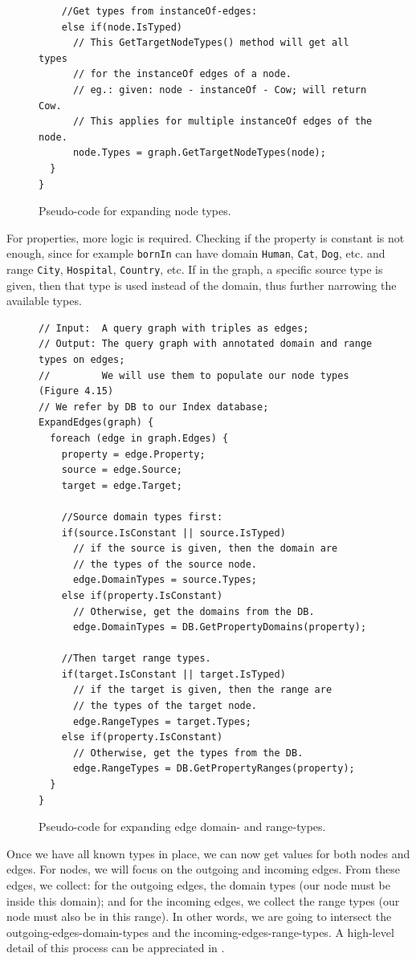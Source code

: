 \begin{example}
\begin{figure}[h]
\begin{verbatim}
    //Get types from instanceOf-edges:
    else if(node.IsTyped) 
      // This GetTargetNodeTypes() method will get all types
      // for the instanceOf edges of a node.
      // eg.: given: node - instanceOf - Cow; will return Cow.
      // This applies for multiple instanceOf edges of the node.
      node.Types = graph.GetTargetNodeTypes(node);
  }
}
\end{verbatim}
\caption{Pseudo-code for expanding node types.}
\label{fig:codeExpandNodes}
\end{figure}

For properties, more logic is required. Checking if the property is constant is not enough, since for example \texttt{bornIn} can have domain \texttt{Human}, \texttt{Cat}, \texttt{Dog}, etc. and range \texttt{City}, \texttt{Hospital}, \texttt{Country}, etc. If in the graph, a specific source type is given, then that type is used instead of the domain, thus further narrowing the available types.

\begin{figure}[h]
\begin{verbatim}
// Input:  A query graph with triples as edges;
// Output: The query graph with annotated domain and range types on edges;
//         We will use them to populate our node types (Figure 4.15)
// We refer by DB to our Index database;
ExpandEdges(graph) {
  foreach (edge in graph.Edges) {
    property = edge.Property;
    source = edge.Source;
    target = edge.Target;

    //Source domain types first:
    if(source.IsConstant || source.IsTyped)
      // if the source is given, then the domain are 
      // the types of the source node.
      edge.DomainTypes = source.Types;
    else if(property.IsConstant)
      // Otherwise, get the domains from the DB.
      edge.DomainTypes = DB.GetPropertyDomains(property);

    //Then target range types.
    if(target.IsConstant || target.IsTyped)
      // if the target is given, then the range are 
      // the types of the target node.
      edge.RangeTypes = target.Types;
    else if(property.IsConstant)
      // Otherwise, get the types from the DB.
      edge.RangeTypes = DB.GetPropertyRanges(property);
  }
}
\end{verbatim}
\caption{Pseudo-code for expanding edge domain- and range-types.}
\label{fig:codeExpandEdges}
\end{figure}

Once we have all known types in place, we can now get values for both nodes and edges. For nodes, we will focus on the outgoing and incoming edges. From these edges, we collect: for the outgoing edges, the domain types (our node must be inside this domain); and for the incoming edges, we collect the range types (our node must also be in this range). In other words, we are going to intersect the outgoing-edges-domain-types and the incoming-edges-range-types. A high-level detail of this process can be appreciated in .


\end{example}
